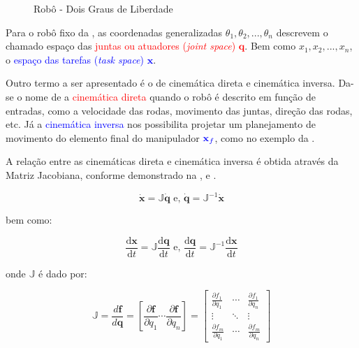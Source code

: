 \begin{figure}[!ht]

\caption{Robô - Dois Graus de Liberdade}
\label{fig:2dof-robot}
\end{figure}

Para o robô fixo da , as coordenadas generalizadas $\theta_1, \theta_2,..., \theta_n$ descrevem o chamado espaço das \textcolor{red}{juntas ou atuadores (\textit{joint space}) $\mathbf{q}$}. Bem como $x_1, x_2,..., x_n$, o \textcolor{blue}{espaço das tarefas (\textit{task space}) $\mathbf{x}$}.

Outro termo a ser apresentado é o de cinemática direta e cinemática inversa. Da-se o nome de a \textcolor{red}{cinemática direta} quando o robô é descrito em função de entradas, como a velocidade das rodas, movimento das juntas, direção das rodas, etc. Já a \textcolor{blue}{cinemática inversa} nos possibilita projetar um planejamento de movimento do elemento final do manipulador $\textcolor{blue}{\mathbf{x}_f}$, como no exemplo da .

A relação entre as cinemáticas direta e cinemática inversa é obtida através da Matriz Jacobiana, conforme demonstrado na ,  e .

\begin{equation}
    \mathbf{\dot{x}} = \mathbb{J}{\mathbf{\dot{q}}}
    \text{ e, }
    \mathbf{\dot{q}} = \mathbb{J}^{-1}{\mathbf{\dot{x}}}
    \label{eq:jac01}
\end{equation}

\noindent bem como:

\begin{equation}
    \frac{\text{d}\mathbf{x}}{\text{d}t} = \mathbb{J}\frac{\text{d}\mathbf{q}}{\text{d}t}
    \text{ e, }
    \frac{\text{d}\mathbf{q}}{\text{d}t} = \mathbb{J}^{-1}\frac{\text{d}\mathbf{x}}{\text{d}t}
    \label{eq:jac02}
\end{equation}

\noindent onde $\mathbb{J}$ é dado por:

\begin{equation}
    \mathbb{J}
    =
    \frac{d \mathbf{f}}{d \mathbf{q}}
    =
    \left[ \frac{\partial \mathbf{f}}{\partial q_1}
        \cdots \frac{\partial \mathbf{f}}{\partial q_n} \right]
    =
    \begin{bmatrix}
        \frac{\partial f_1}{\partial q_1} & \cdots &
        \frac{\partial f_1}{\partial q_n}                   \\
        \vdots                            & \ddots & \vdots \\
        \frac{\partial f_m}{\partial q_1} & \cdots &
        \frac{\partial f_m}{\partial q_n}
    \end{bmatrix}
    \label{eq:jac03}
\end{equation}

